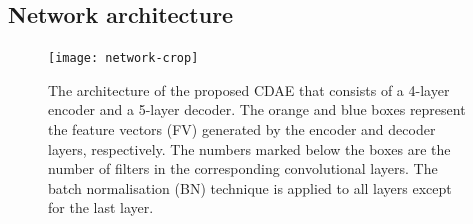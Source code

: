 \documentclass[fleqn,usenatbib]{mnras}
\newcommand{\editone}[1]{{\leavevmode\color{cyan}#1}}
\begin{document}
\subsection{Network architecture}
\label{sec:architecture}

\begin{figure}
  \centering
  \texttt{[image: network-crop]}
  \caption{\label{fig:network}\editone{%
    The architecture of the proposed CDAE that consists of a 4-layer
    encoder and a 5-layer decoder.
    The orange and blue boxes represent the feature vectors (FV) generated
    by the encoder and decoder layers, respectively.
    The numbers marked below the boxes are the number of filters in the
    corresponding convolutional layers.
    The batch normalisation (BN) technique is applied to all layers except
    for the last layer.
  }}
\end{figure}
\end{document}
